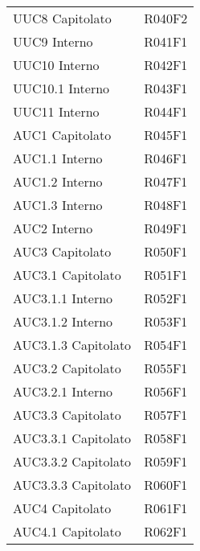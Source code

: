 \documentclass[../analisi-dei-requisiti.tex]{subfiles}
\begin{document}
\begin{longtable}[H]{ p{4cm} | p{4cm} }
  UUC8 Capitolato               & R040F2                               \\
  UUC9 Interno                  & R041F1                               \\
  UUC10 Interno                 & R042F1                               \\
  UUC10.1 Interno               & R043F1                               \\
  UUC11 Interno                 & R044F1                               \\
  AUC1 Capitolato               & R045F1                               \\
  AUC1.1 Interno                & R046F1                               \\
  AUC1.2 Interno                & R047F1                               \\
  AUC1.3 Interno                & R048F1                               \\
  AUC2 Interno                  & R049F1                               \\
  AUC3 Capitolato               & R050F1                               \\
  AUC3.1 Capitolato             & R051F1                               \\
  AUC3.1.1 Interno              & R052F1                               \\
  AUC3.1.2 Interno              & R053F1                               \\
  AUC3.1.3 Capitolato           & R054F1                               \\
  AUC3.2 Capitolato             & R055F1                               \\
  AUC3.2.1 Interno              & R056F1                               \\
  AUC3.3 Capitolato             & R057F1                               \\
  AUC3.3.1 Capitolato           & R058F1                               \\
  AUC3.3.2 Capitolato           & R059F1                               \\
  AUC3.3.3 Capitolato           & R060F1                               \\
  AUC4 Capitolato               & R061F1                               \\
  AUC4.1 Capitolato             & R062F1                               \\

\end{longtable}
\end{document}
